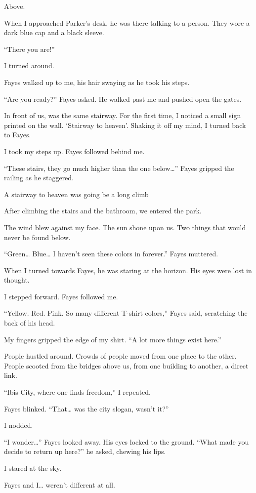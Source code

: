 Above.

When I approached Parker’s desk, he was there talking to a person. They wore a dark blue cap and a black sleeve.

“There you are!”

I turned around.

Fayes walked up to me, his hair swaying as he took his steps. 

“Are you ready?” Fayes asked. He walked past me and pushed open the gates.

In front of us, was the same stairway. For the first time, I noticed a small sign printed on the wall. ‘Stairway to heaven’. Shaking it off my mind, I turned back to Fayes. 

I took my steps up. Fayes followed behind me.

“These stairs, they go much higher than the one below…” Fayes gripped the railing as he staggered.

A stairway to heaven was going be a long climb

After climbing the stairs and the bathroom, we entered the park.

The wind blew against my face. The sun shone upon us. Two things that would never be found below.

“Green… Blue… I haven’t seen these colors in forever.” Fayes muttered.

When I turned towards Fayes, he was staring at the horizon. His eyes were lost in thought.

I stepped forward. Fayes followed me.

“Yellow. Red. Pink. So many different T-shirt colors,” Fayes said, scratching the back of his head.

My fingers gripped the edge of my shirt. “A lot more things exist here.”

People hustled around. Crowds of people moved from one place to the other. People scooted from the bridges above us, from one building to another, a direct link.

“Ibis City, where one finds freedom,” I repeated.

Fayes blinked. “That… was the city slogan, wasn’t it?”

I nodded.

“I wonder…” Fayes looked away. His eyes locked to the ground. “What made you decide to return up here?” he asked, chewing his lips.

I stared at the sky. 

Fayes and I… weren’t different at all.

